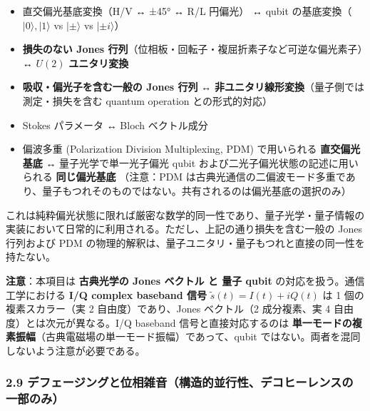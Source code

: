 \documentclass[
]{ltjsarticle}
\providecommand{\tightlist}{%
  \setlength{\itemsep}{0pt}\setlength{\parskip}{0pt}}
\begin{document}
\begin{itemize}
\tightlist
\item
  直交偏光基底変換（H/V ↔ ±45° ↔ R/L 円偏光） ↔ qubit
  の基底変換（\(|0\rangle, |1\rangle\) vs \(|\pm\rangle\) vs
  \(|\pm i\rangle\)）
\item
  \textbf{損失のない Jones
  行列}（位相板・回転子・複屈折素子など可逆な偏光素子）↔ \(U(2)\)
  \textbf{ユニタリ変換}
\item
  \textbf{吸収・偏光子を含む一般の Jones 行列} ↔
  \textbf{非ユニタリ線形変換}（量子側では測定・損失を含む quantum
  operation との形式的対応）
\item
  Stokes パラメータ ↔ Bloch ベクトル成分
\item
  偏波多重 (Polarization Division Multiplexing, PDM) で用いられる
  \textbf{直交偏光基底} ↔ 量子光学で単一光子偏光 qubit
  および二光子偏光状態の記述に用いられる \textbf{同じ偏光基底}
  （注意：PDM
  は古典光通信の二偏波モード多重であり、量子もつれそのものではない。共有されるのは偏光基底の選択のみ）
\end{itemize}

これは純粋偏光状態に限れば厳密な数学的同一性であり、量子光学・量子情報の実装において日常的に利用される。ただし、上記の通り損失を含む一般の
Jones 行列および PDM
の物理的解釈は、量子ユニタリ・量子もつれと直接の同一性を持たない。

\textbf{注意}：本項目は \textbf{古典光学の Jones ベクトル と 量子 qubit}
の対応を扱う。通信工学における \textbf{I/Q complex baseband 信号}
\(\tilde{s}(t) = I(t) + iQ(t)\) は 1 個の複素スカラー（実 2
自由度）であり、Jones ベクトル（2 成分複素、実 4
自由度）とは次元が異なる。I/Q baseband 信号と直接対応するのは
\textbf{単一モードの複素振幅}（古典電磁場の単一モード振幅）であって、qubit
ではない。両者を混同しないよう注意が必要である。

\subsubsection{2.9
デフェージングと位相雑音（構造的並行性、デコヒーレンスの一部のみ）}\label{ux30c7ux30d5ux30a7ux30fcux30b8ux30f3ux30b0ux3068ux4f4dux76f8ux96d1ux97f3ux69cbux9020ux7684ux4e26ux884cux6027ux30c7ux30b3ux30d2ux30fcux30ecux30f3ux30b9ux306eux4e00ux90e8ux306eux307f}
\end{document}
